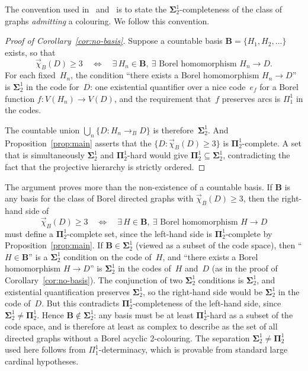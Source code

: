 \begin{remark}\label{rmk:sigma-pi-convention}
The convention used in~\cite{Todorcevic_2021_ComplexProbBorel} and~\cite{thornton2022algebraic} is to state the $\mathbf\Sigma^1_2$-completeness of the class of graphs \emph{admitting} a colouring.
We follow this convention.
\end{remark}

\begin{proof}[Proof of Corollary~\ref{cor:no-basis}]
Suppose a countable basis $\mathbf{B} = \{H_1,H_2,\dots\}$ exists, so that
$$
	\vec\chi_B(D) \geq 3
	\quad\Longleftrightarrow\quad
	\exists\, H_n\in\mathbf{B},\ \exists\text{ Borel homomorphism } H_n\to D.
$$
For each fixed~$H_n$, the condition ``there exists a Borel homomorphism $H_n\to D$'' is $\mathbf\Sigma^1_2$ in the code for~$D$: one existential quantifier over a nice code~$e_f$ for a Borel function $f\colon V(H_n)\to V(D)$, and the requirement that~$f$ preserves arcs is $\Pi^1_1$ in the codes.

The countable union $\bigcup_n \{D : H_n\to_B D\}$ is therefore~$\mathbf\Sigma^1_2$.
And Proposition~\ref{prop:main} asserts that the $\{D : \vec\chi_B(D)\geq 3\}$ is $\mathbf\Pi^1_2$-complete.
A set that is simultaneously $\mathbf\Sigma^1_2$ and $\mathbf\Pi^1_2$-hard would give $\mathbf\Pi^1_2 \subseteq \mathbf\Sigma^1_2$, contradicting the fact that the projective hierarchy is strictly ordered.
\end{proof}

\begin{remark}\label{rmk:complexity-lower-bound}
The argument proves more than the non-existence of a countable basis.
If $\mathbf{B}$ is any basis for the class of Borel directed graphs with $\vec\chi_B(D)\geq 3$, then the right-hand side of
$$
	\vec\chi_B(D)\geq 3 \quad\Longleftrightarrow\quad \exists\, H\in\mathbf{B},\ \exists\text{ Borel homomorphism }H\to D
$$
must define a $\mathbf\Pi^1_2$-complete set, since the left-hand side is $\mathbf\Pi^1_2$-complete by Proposition~\ref{prop:main}.
If $\mathbf{B}\in\mathbf\Sigma^1_2$ (viewed as a subset of the code space), then ``$H\in\mathbf{B}$'' is a $\mathbf\Sigma^1_2$ condition on the code of~$H$, and ``there exists a Borel homomorphism $H\to D$'' is $\mathbf\Sigma^1_2$ in the codes of~$H$ and~$D$ (as in the proof of Corollary~\ref{cor:no-basis}).
The conjunction of two $\mathbf\Sigma^1_2$ conditions is $\mathbf\Sigma^1_2$, and existential quantification preserves $\mathbf\Sigma^1_2$, so the right-hand side would be $\mathbf\Sigma^1_2$ in the code of~$D$.
But this contradicts $\mathbf\Pi^1_2$-completeness of the left-hand side, since $\mathbf\Sigma^1_2\neq\mathbf\Pi^1_2$.
Hence $\mathbf{B}\notin\mathbf\Sigma^1_2$: any basis must be at least $\mathbf\Pi^1_2$-hard as a subset of the code space, and is therefore at least as complex to describe as the set of all directed graphs without a Borel acyclic 2-colouring.
The separation $\mathbf\Sigma^1_2\neq\mathbf\Pi^1_2$ used here follows from $\Pi^1_1$-determinacy, which is provable from standard large cardinal hypotheses.
\end{remark}